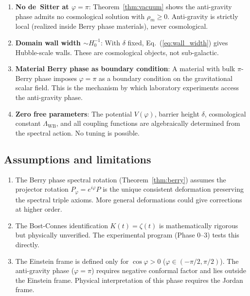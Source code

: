 \documentclass[aps,prd,twocolumn,superscriptaddress,nofootinbib]{revtex4-2}
\newcommand{\Lw}{\Lambda_{\mathrm{WB}}}
\begin{document}
\begin{enumerate}
\item \textbf{No de~Sitter at $\varphi = \pi$}:
  Theorem~\ref{thm:vacuum} shows the anti-gravity phase
  admits no cosmological solution with $\rho_m \geq 0$.
  Anti-gravity is strictly local (realized inside Berry phase
  materials), never cosmological.

\item \textbf{Domain wall width $\sim H_0^{-1}$}:
  With $\delta$ fixed, Eq.~(\ref{eq:wall_width}) gives
  Hubble-scale walls.  These are cosmological objects,
  not sub-galactic.

\item \textbf{Material Berry phase as boundary condition}:
  A material with bulk $\pi$-Berry phase imposes
  $\varphi = \pi$ as a boundary condition on the
  gravitational scalar field.  This is the mechanism
  by which laboratory experiments access the anti-gravity phase.

\item \textbf{Zero free parameters}:
  The potential $V(\varphi)$, barrier height $\delta$,
  cosmological constant $\Lw$, and all coupling functions
  are algebraically determined from the spectral action.
  No tuning is possible.
\end{enumerate}

\subsection{Assumptions and limitations}

\begin{enumerate}
\item The Berry phase spectral rotation
  (Theorem~\ref{thm:berry}) assumes the projector rotation
  $P_\varphi = e^{i\varphi}P$ is the unique consistent
  deformation preserving the spectral triple axioms.
  More general deformations could give corrections at
  higher order.

\item The Bost-Connes identification $K(t) = \zeta(t)$
  is mathematically rigorous but physically unverified.
  The experimental program (Phase 0--3) tests this directly.

\item The Einstein frame is defined only for
  $\cos\varphi > 0$ ($\varphi \in (-\pi/2, \pi/2)$).
  The anti-gravity phase ($\varphi = \pi$) requires
  negative conformal factor and lies outside the
  Einstein frame. Physical interpretation of this phase
  requires the Jordan frame.
\end{enumerate}
\end{document}
